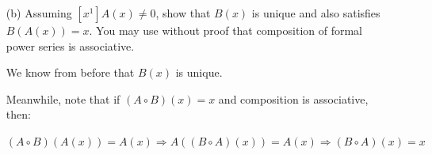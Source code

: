 \documentclass{book}
\newcommand{\exOne}{%
   \color{Purple}%
   \fontsize{13}{15}\selectfont%
}
\newenvironment{myIndent}{%
   \begin{adjustwidth}{2.5em}{0em}%
}{%
   \end{adjustwidth}%
}
\newcommand{\retTwo}{\hfill\bigbreak}
\begin{document}
\begin{enumerate}
\begin{myIndent}
      It follows that by induction, there exists a unique formal power series $B(x)$ such that $A(B(x)) = x$.\retTwo
   \end{myIndent}

   \item[(b)] Assuming $[x^1]A(x) \neq 0$, show that $B(x)$ is unique and also satisfies\\ $B(A(x)) = x$. You may use without proof that composition of formal\\ power series is associative.
   
   \begin{myIndent}\exOne
      We know from before that $B(x)$ is unique.\retTwo

      Meanwhile, note that if $(A \circ B)(x) = x$ and composition is associative, then:
      
      {\centering $(A \circ B)(A(x)) = A(x) \Longrightarrow A((B \circ A)(x)) = A(x) \Longrightarrow (B \circ A)(x) = x$ \newpage\par}
   \end{myIndent}
\end{enumerate}
\end{document}
